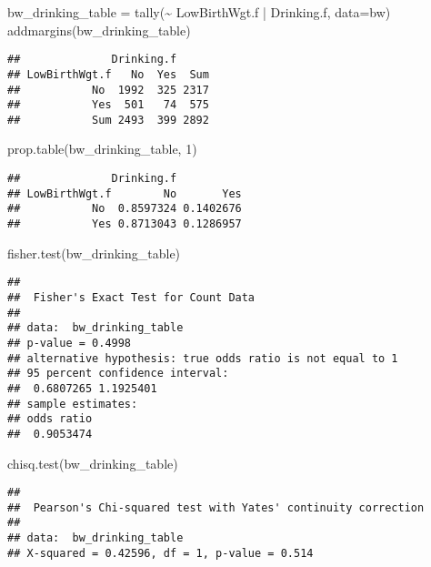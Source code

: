 \documentclass[
]{article}
\newenvironment{Shaded}{\begin{snugshade}}{\end{snugshade}}
\newcommand{\AttributeTok}[1]{\textcolor[rgb]{0.77,0.63,0.00}{#1}}
\newcommand{\DecValTok}[1]{\textcolor[rgb]{0.00,0.00,0.81}{#1}}
\newcommand{\FunctionTok}[1]{\textcolor[rgb]{0.00,0.00,0.00}{#1}}
\newcommand{\NormalTok}[1]{#1}
\newcommand{\OtherTok}[1]{\textcolor[rgb]{0.56,0.35,0.01}{#1}}
\newcommand{\SpecialCharTok}[1]{\textcolor[rgb]{0.00,0.00,0.00}{#1}}
\begin{document}
\begin{Shaded}
\begin{Highlighting}[]
\NormalTok{bw\_drinking\_table }\OtherTok{=} \FunctionTok{tally}\NormalTok{(}\SpecialCharTok{\textasciitilde{}}\NormalTok{ LowBirthWgt.f }\SpecialCharTok{|}\NormalTok{ Drinking.f, }\AttributeTok{data=}\NormalTok{bw)}
\FunctionTok{addmargins}\NormalTok{(bw\_drinking\_table)}
\end{Highlighting}
\end{Shaded}

\begin{verbatim}
##              Drinking.f
## LowBirthWgt.f   No  Yes  Sum
##           No  1992  325 2317
##           Yes  501   74  575
##           Sum 2493  399 2892
\end{verbatim}

\begin{Shaded}
\begin{Highlighting}[]
\FunctionTok{prop.table}\NormalTok{(bw\_drinking\_table, }\DecValTok{1}\NormalTok{)}
\end{Highlighting}
\end{Shaded}

\begin{verbatim}
##              Drinking.f
## LowBirthWgt.f        No       Yes
##           No  0.8597324 0.1402676
##           Yes 0.8713043 0.1286957
\end{verbatim}

\begin{Shaded}
\begin{Highlighting}[]
\FunctionTok{fisher.test}\NormalTok{(bw\_drinking\_table)}
\end{Highlighting}
\end{Shaded}

\begin{verbatim}
## 
##  Fisher's Exact Test for Count Data
## 
## data:  bw_drinking_table
## p-value = 0.4998
## alternative hypothesis: true odds ratio is not equal to 1
## 95 percent confidence interval:
##  0.6807265 1.1925401
## sample estimates:
## odds ratio 
##  0.9053474
\end{verbatim}

\begin{Shaded}
\begin{Highlighting}[]
\FunctionTok{chisq.test}\NormalTok{(bw\_drinking\_table)}
\end{Highlighting}
\end{Shaded}

\begin{verbatim}
## 
##  Pearson's Chi-squared test with Yates' continuity correction
## 
## data:  bw_drinking_table
## X-squared = 0.42596, df = 1, p-value = 0.514
\end{verbatim}
\end{document}
